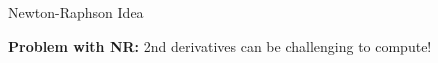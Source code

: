 \documentclass[11pt,compress,t,notes=noshow, xcolor=table]{beamer}
\begin{document}
\begin{vbframe}{Newton-Raphson Idea}




\textbf{Problem with NR:} 2nd derivatives can be challenging to compute! 

\end{vbframe}
\end{document}
